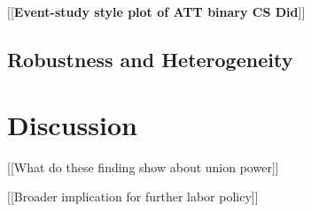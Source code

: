 [[\textbf{Event-study style plot of ATT binary CS Did}]]

\subsection{Robustness and Heterogeneity}




\section{Discussion}
[[What do these finding show about union power]]



[[Broader implication for further labor policy]]
